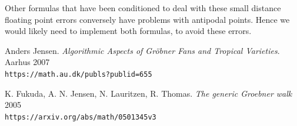\documentclass[12pt,a4paper]{report}
\begin{document}

Other formulas that have been conditioned to deal with these small distance floating point errors conversely have problems with antipodal points. Hence we would likely need to implement both formulas, to avoid these errors.

 \begin{thebibliography}{2}
 Anders Jensen.
 \textit{Algorithmic Aspects of Gr\"{o}bner Fans and Tropical Varieties}.
 Aarhus 2007
 \\\texttt{https://math.au.dk/publs?publid=655}
 
 K. Fukuda, A. N. Jensen, N. Lauritzen, R. Thomas.
 \textit{The generic Groebner walk}
 2005
 \\\texttt{https://arxiv.org/abs/math/0501345v3}
 
 \end{thebibliography}
\end{document}
